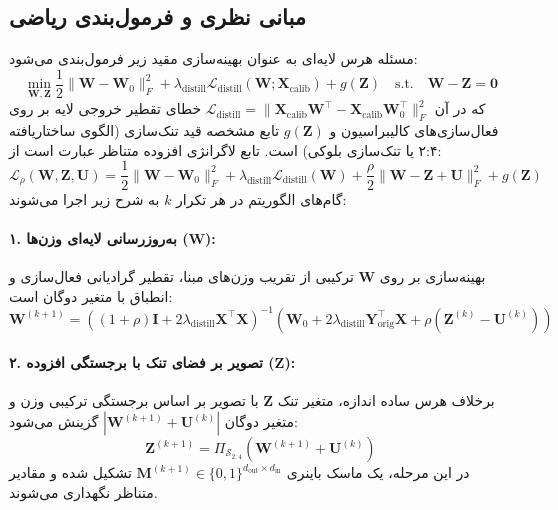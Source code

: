 \subsection{مبانی نظری و فرمول‌بندی ریاضی}
مسئله هرس لایه‌ای به عنوان بهینه‌سازی مقید زیر فرمول‌بندی می‌شود:
\begin{equation}
\min_{\mathbf{W}, \mathbf{Z}} \frac{1}{2} \|\mathbf{W} - \mathbf{W}_0\|_F^2 + \lambda_{\text{distill}} \mathcal{L}_{\text{distill}}(\mathbf{W}; \mathbf{X}_{\text{calib}}) + g(\mathbf{Z}) \quad \text{s.t.} \quad \mathbf{W} - \mathbf{Z} = \mathbf{0}
\end{equation}
که در آن $\mathcal{L}_{\text{distill}} = \|\mathbf{X}_{\text{calib}} \mathbf{W}^\top - \mathbf{X}_{\text{calib}} \mathbf{W}_0^\top\|_F^2$ خطای تقطیر خروجی لایه بر روی فعال‌سازی‌های کالیبراسیون و $g(\mathbf{Z})$ تابع مشخصه قید تنک‌سازی (الگوی ساختاریافته ۲:۴ یا تنک‌سازی بلوکی) است. تابع لاگرانژی افزوده متناظر عبارت است از:
\begin{equation}
\mathcal{L}_{\rho}(\mathbf{W}, \mathbf{Z}, \mathbf{U}) = \frac{1}{2} \|\mathbf{W} - \mathbf{W}_0\|_F^2 + \lambda_{\text{distill}} \mathcal{L}_{\text{distill}}(\mathbf{W}) + \frac{\rho}{2} \|\mathbf{W} - \mathbf{Z} + \mathbf{U}\|_F^2 + g(\mathbf{Z})
\end{equation}
گام‌های الگوریتم در هر تکرار $k$ به شرح زیر اجرا می‌شوند:

\paragraph{۱. به‌روزرسانی لایه‌ای وزن‌ها ($\mathbf{W}$):}
بهینه‌سازی بر روی $\mathbf{W}$ ترکیبی از تقریب وزن‌های مبنا، تقطیر گرادیانی فعال‌سازی و انطباق با متغیر دوگان است:
\begin{equation}
\mathbf{W}^{(k+1)} = \left( (1 + \rho)\mathbf{I} + 2\lambda_{\text{distill}} \mathbf{X}^\top \mathbf{X} \right)^{-1} \left( \mathbf{W}_0 + 2\lambda_{\text{distill}} \mathbf{Y}_{\text{orig}}^\top \mathbf{X} + \rho (\mathbf{Z}^{(k)} - \mathbf{U}^{(k)}) \right)
\end{equation}

\paragraph{۲. تصویر بر فضای تنک با برجستگی افزوده ($\mathbf{Z}$):}
برخلاف هرس ساده اندازه، متغیر تنک $\mathbf{Z}$ با تصویر بر اساس برجستگی ترکیبی وزن و متغیر دوگان $|\mathbf{W}^{(k+1)} + \mathbf{U}^{(k)}|$ گزینش می‌شود:
\begin{equation}
\mathbf{Z}^{(k+1)} = \Pi_{\mathcal{S}_{2:4}}\left( \mathbf{W}^{(k+1)} + \mathbf{U}^{(k)} \right)
\end{equation}
در این مرحله، یک ماسک باینری $\mathbf{M}^{(k+1)} \in \{0, 1\}^{d_{\text{out}} \times d_{\text{in}}}$ تشکیل شده و مقادیر متناظر نگهداری می‌شوند.

